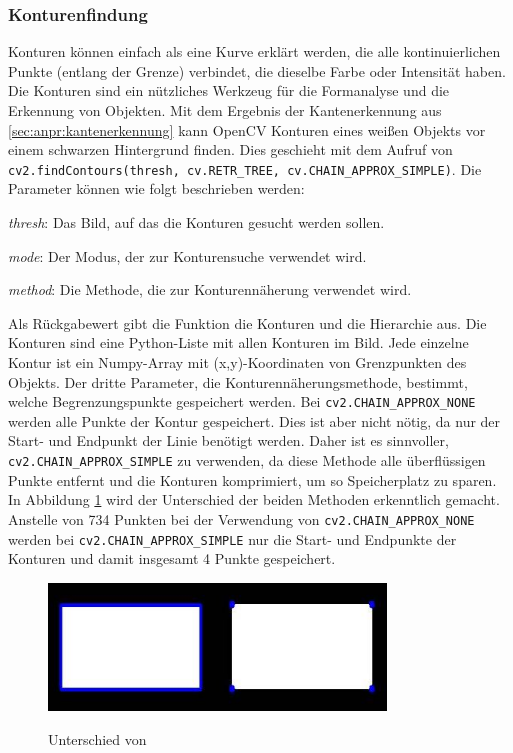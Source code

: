 \subsubsection{Konturenfindung}
Konturen können einfach als eine Kurve erklärt werden, die alle kontinuierlichen Punkte (entlang der Grenze) verbindet, die dieselbe Farbe oder Intensität haben. Die Konturen sind ein nützliches Werkzeug für die Formanalyse und die Erkennung von Objekten.
Mit dem Ergebnis der Kantenerkennung aus \ref{sec:anpr:kantenerkennung} kann OpenCV Konturen eines weißen Objekts vor einem schwarzen Hintergrund finden. Dies geschieht mit dem Aufruf von \verb|cv2.findContours(thresh, cv.RETR_TREE, cv.CHAIN_APPROX_SIMPLE)|. Die Parameter können wie folgt beschrieben werden:
\begin{compactenum}
    \item \textit{thresh}: Das Bild, auf das die Konturen gesucht werden sollen.
    \item \textit{mode}: Der Modus, der zur Konturensuche verwendet wird.
    \item \textit{method}: Die Methode, die zur Konturennäherung verwendet wird.
\end{compactenum}
Als Rückgabewert gibt die Funktion die Konturen und die Hierarchie aus. Die Konturen sind eine Python-Liste mit allen Konturen im Bild. Jede einzelne Kontur ist ein Numpy-Array mit (x,y)-Koordinaten von Grenzpunkten des Objekts.
Der dritte Parameter, die Konturennäherungsmethode, bestimmt, welche Begrenzungspunkte gespeichert werden. Bei \verb|cv2.CHAIN_APPROX_NONE| werden alle Punkte der Kontur gespeichert. Dies ist aber nicht nötig, da nur der Start- und Endpunkt der Linie benötigt werden. Daher ist es sinnvoller, \verb|cv2.CHAIN_APPROX_SIMPLE| zu verwenden, da diese Methode alle überflüssigen Punkte entfernt und die Konturen komprimiert, um so Speicherplatz zu sparen.
In Abbildung \ref{fig:anpr:contour:cam} wird der Unterschied der beiden Methoden erkenntlich gemacht. Anstelle von 734 Punkten bei der Verwendung von \verb|cv2.CHAIN_APPROX_NONE| werden bei \verb|cv2.CHAIN_APPROX_SIMPLE| nur die Start- und Endpunkte der Konturen und damit insgesamt 4 Punkte gespeichert.\cite{drawContours}
\begin{figure}[H]
    \centering
    \includegraphics[width=0.8\textwidth]{pics/none.jpg}
    \caption{Unterschied von}
    \cite{CAMPic}
    \label{fig:anpr:contour:cam}
    \end{figure}
